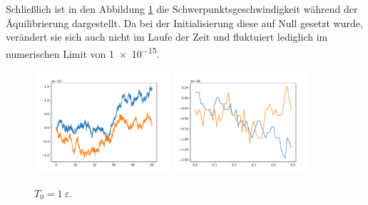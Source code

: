 Schließlich ist in den Abbildung \ref{fig:v1} die Schwerpunktsgeschwindigkeit während der Äquilibrierung
dargestellt. Da bei der Initialisierung diese auf Null gesetzt wurde, verändert sie sich
auch nicht im Laufe der Zeit und fluktuiert lediglich im numerischen Limit von
\num{1e-15}.
\begin{figure}
    \centering
    \includegraphics[width=0.45\textwidth]{A1/build/aequi1_V.pdf}
    \includegraphics[width=0.45\textwidth]{A1/build/aequi1_VV.pdf}
    \caption{$T_\text{0} = 1\:\varepsilon$.}
    \label{fig:v1}
\end{figure} 

